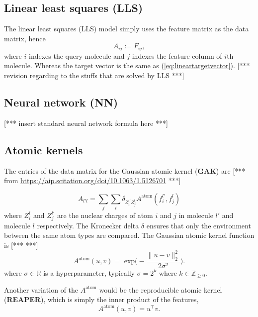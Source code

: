 \documentclass[12pt]{article}
\def\att{                    %
        \marginpar[ \hspace*{\fill} \raisebox{-0.2em}{\rule{2mm}{1.2em}} ]
        {\raisebox{-0.2em}{\rule{2mm}{1.2em}} }
        }
\def\at#1{[*** \att #1 ***]}  %
\begin{document}
\subsection{Linear least squares (LLS)}
\label{subsec:LLS}
The linear least squares (LLS) model simply uses the feature matrix as the data matrix, hence
\begin{equation}
	\label{eq:lls}
	A_{ij} := F_{ij},
\end{equation}
where $i$ indexes the query molecule and $j$ indexes the feature column of $i$th molecule. Whereas the target vector is the same as (\ref{eq:lineartargetvector}).
\at{revision regarding to the stuffs that are solved by LLS}

\subsection{Neural network (NN)}
\label{subsec:NN}
\at{insert standard neural network formula here}

\subsection{Atomic kernels}
The entries of the data matrix for the Gaussian atomic kernel (\textbf{GAK}) are \at{\cite[Eq. (10)]{Faber et al} from \url{https://aip.scitation.org/doi/10.1063/1.5126701}}
\iffalse
\begin{equation}
	A_{l' l} = \sum_P \sum_{Z^{l'}_i = P} \sum_{Z^{l}_j = P} A^\text{atom}(f^{l'}_i, f^l_j)
	\label{eq:gaussian_atom}
\end{equation}
\fi
\begin{equation}
	A_{l'l} = \sum_j \sum_i \delta_{Z_i^{l'}Z_j^{l}} A^\text{atom}(f_i^{l'}, f_j^l)
	\label{eq:gaussian_atom}
\end{equation}
where $Z_i^l$ and $Z_j^{l'}$ are the nuclear charges of atom $i$ and $j$ in molecule $l'$ and molecule $l$ respectively. The Kronecker delta $\delta$ ensures that only the environment between the same atom types are compared. The Gaussian atomic kernel function is \at{\cite[Eq. (26)]{Faber et al}}
\begin{equation}
	A^\text{atom}(u, v) = \text{ exp}\Big( - \frac{\|u - v \|^2_2}{2 \sigma^2} \Big).
\end{equation}
where $\sigma \in \mathbb{R}$ is a hyperparameter, typically $\sigma = 2^k$ where $k \in \mathbb{Z}_{\geq 0}$.

Another variation of the $A^\text{atom}$ would be the reproducible atomic kernel (\textbf{REAPER}), which is simply the inner product of the features,
\begin{equation}
	A^\text{atom}(u, v) = u^\top v.
	\label{eq:reaper_atom}
\end{equation}
\end{document}
